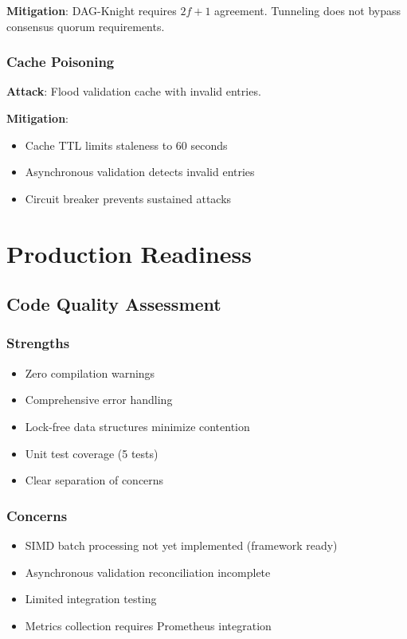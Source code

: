 \documentclass[11pt,a4paper]{article}
\begin{document}
\textbf{Mitigation}: DAG-Knight requires $2f+1$ agreement. Tunneling does not bypass consensus quorum requirements.

\subsubsection{Cache Poisoning}
\textbf{Attack}: Flood validation cache with invalid entries.

\textbf{Mitigation}: 
\begin{itemize}
    \item Cache TTL limits staleness to 60 seconds
    \item Asynchronous validation detects invalid entries
    \item Circuit breaker prevents sustained attacks
\end{itemize}

\section{Production Readiness}

\subsection{Code Quality Assessment}

\subsubsection{Strengths}
\begin{itemize}
    \item Zero compilation warnings
    \item Comprehensive error handling
    \item Lock-free data structures minimize contention
    \item Unit test coverage (5 tests)
    \item Clear separation of concerns
\end{itemize}

\subsubsection{Concerns}
\begin{itemize}
    \item SIMD batch processing not yet implemented (framework ready)
    \item Asynchronous validation reconciliation incomplete
    \item Limited integration testing
    \item Metrics collection requires Prometheus integration
\end{itemize}
\end{document}
